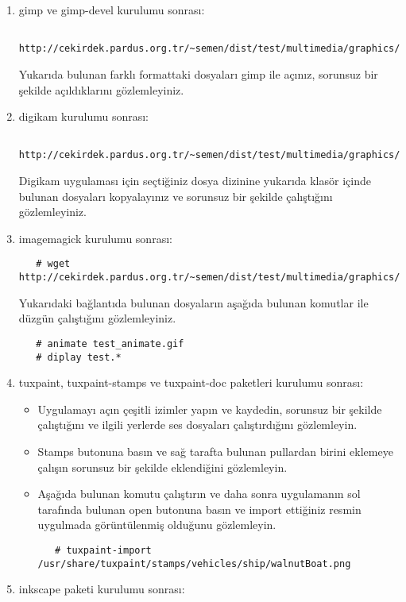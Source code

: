 \documentclass[a4paper,10pt]{article}
\begin{document}
\begin{enumerate}
 \item gimp ve gimp-devel kurulumu sonrası:
  \begin{verbatim}
   http://cekirdek.pardus.org.tr/~semen/dist/test/multimedia/graphics/graphics.tar
  \end{verbatim}

 Yukarıda bulunan farklı formattaki dosyaları gimp ile açınız, sorunsuz bir şekilde açıldıklarını gözlemleyiniz.
\item digikam kurulumu sonrası:

  \begin{verbatim}
   http://cekirdek.pardus.org.tr/~semen/dist/test/multimedia/graphics/graphics.tar
  \end{verbatim}

 Digikam uygulaması için seçtiğiniz dosya dizinine yukarıda klasör içinde bulunan dosyaları kopyalayınız ve sorunsuz bir şekilde çalıştığını gözlemleyiniz.
\item imagemagick kurulumu sonrası:
  \begin{verbatim}
   # wget http://cekirdek.pardus.org.tr/~semen/dist/test/multimedia/graphics/graphics.tar
  \end{verbatim}

Yukarıdaki bağlantıda bulunan dosyaların aşağıda bulunan komutlar ile düzgün çalıştığını gözlemleyiniz.
  \begin{verbatim}
   # animate test_animate.gif
   # diplay test.*
  \end{verbatim}
\item tuxpaint, tuxpaint-stamps ve tuxpaint-doc paketleri kurulumu sonrası:
  \begin{itemize}
   \item  Uygulamayı açın çeşitli izimler yapın ve kaydedin, sorunsuz bir şekilde çalıştığını ve ilgili yerlerde ses dosyaları çalıştırdığını gözlemleyin.
   \item Stamps butonuna basın ve sağ tarafta bulunan pullardan birini eklemeye çalışın sorunsuz bir şekilde eklendiğini gözlemleyin.
   \item Aşağıda bulunan komutu çalıştırın ve daha sonra uygulamanın sol tarafında bulunan open butonuna basın ve import ettiğiniz resmin uygulmada görüntülenmiş olduğunu gözlemleyin.
\begin{verbatim}
   # tuxpaint-import /usr/share/tuxpaint/stamps/vehicles/ship/walnutBoat.png
\end{verbatim} 
\end{itemize}

\item inkscape paketi kurulumu sonrası:


\end{enumerate}
\end{document}
